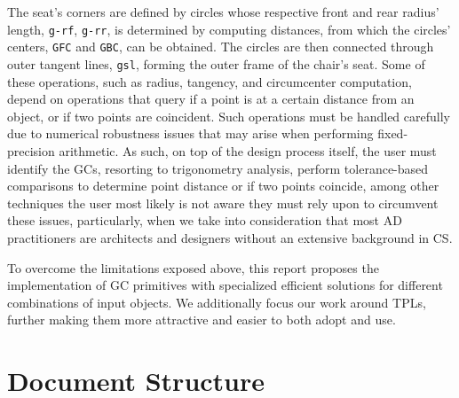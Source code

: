 The seat's corners are defined by circles whose respective front and rear
radius' length, \mbox{\texttt{g-rf}}, \mbox{\texttt{g-rr}}, is determined by
computing distances, from which the circles' centers, \texttt{GFC} and
\texttt{GBC}, can be obtained.  The circles are then connected through outer
tangent lines, \texttt{gsl}, forming the outer frame of the chair's seat.  Some
of these operations, such as radius, tangency, and circumcenter computation,
depend on operations that query if a point is at a certain distance from an
object, or if two points are coincident.  Such operations must be handled
carefully due to numerical robustness issues that may arise when performing
fixed-precision arithmetic.  As such, on top of the design process itself, the
user must identify the \acp{GC}, resorting to trigonometry analysis, perform
tolerance-based comparisons to determine point distance or if two points
coincide, among other techniques the user most likely is not aware they must
rely upon to circumvent these issues, particularly, when we take into
consideration that most \ac{AD} practitioners are architects and designers
without an extensive background in \ac{CS}.

To overcome the limitations exposed above, this report proposes the
implementation of \ac{GC} primitives with specialized efficient solutions for
different combinations of input objects.  We additionally focus our work around
\acp{TPL}, further making them more attractive and easier to both adopt and use.

\section{Document Structure}%
\label{sec:intro.structure}


